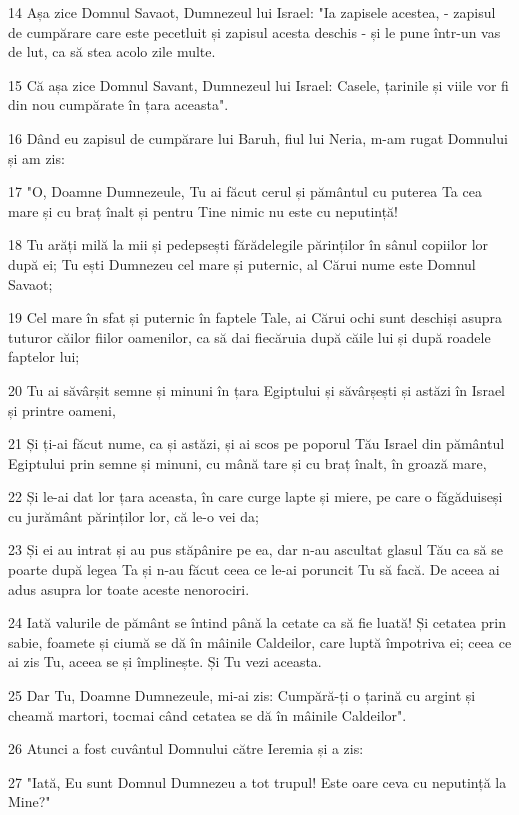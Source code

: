 \par 14 Așa zice Domnul Savaot, Dumnezeul lui Israel: "Ia zapisele acestea, - zapisul de cumpărare care este pecetluit și zapisul acesta deschis - și le pune într-un vas de lut, ca să stea acolo zile multe.
\par 15 Că așa zice Domnul Savant, Dumnezeul lui Israel: Casele, țarinile și viile vor fi din nou cumpărate în țara aceasta".
\par 16 Dând eu zapisul de cumpărare lui Baruh, fiul lui Neria, m-am rugat Domnului și am zis:
\par 17 "O, Doamne Dumnezeule, Tu ai făcut cerul și pământul cu puterea Ta cea mare și cu braț înalt și pentru Tine nimic nu este cu neputință!
\par 18 Tu arăți milă la mii și pedepsești fărădelegile părinților în sânul copiilor lor după ei; Tu ești Dumnezeu cel mare și puternic, al Cărui nume este Domnul Savaot;
\par 19 Cel mare în sfat și puternic în faptele Tale, ai Cărui ochi sunt deschiși asupra tuturor căilor fiilor oamenilor, ca să dai fiecăruia după căile lui și după roadele faptelor lui;
\par 20 Tu ai săvârșit semne și minuni în țara Egiptului și săvârșești și astăzi în Israel și printre oameni,
\par 21 Și ți-ai făcut nume, ca și astăzi, și ai scos pe poporul Tău Israel din pământul Egiptului prin semne și minuni, cu mână tare și cu braț înalt, în groază mare,
\par 22 Și le-ai dat lor țara aceasta, în care curge lapte și miere, pe care o făgăduiseși cu jurământ părinților lor, că le-o vei da;
\par 23 Și ei au intrat și au pus stăpânire pe ea, dar n-au ascultat glasul Tău ca să se poarte după legea Ta și n-au făcut ceea ce le-ai poruncit Tu să facă. De aceea ai adus asupra lor toate aceste nenorociri.
\par 24 Iată valurile de pământ se întind până la cetate ca să fie luată! Și cetatea prin sabie, foamete și ciumă se dă în mâinile Caldeilor, care luptă împotriva ei; ceea ce ai zis Tu, aceea se și împlinește. Și Tu vezi aceasta.
\par 25 Dar Tu, Doamne Dumnezeule, mi-ai zis: Cumpără-ți o țarină cu argint și cheamă martori, tocmai când cetatea se dă în mâinile Caldeilor".
\par 26 Atunci a fost cuvântul Domnului către Ieremia și a zis:
\par 27 "Iată, Eu sunt Domnul Dumnezeu a tot trupul! Este oare ceva cu neputință la Mine?"
